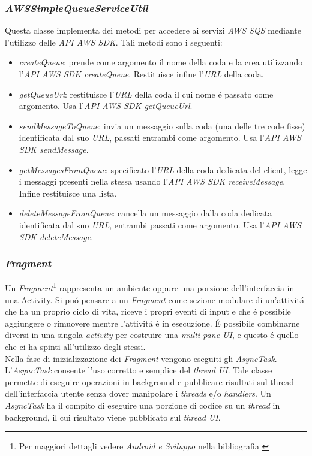 \documentclass{article}
\begin{document}
\subsubsection{\textit{AWSSimpleQueueServiceUtil}}
Questa classe implementa dei metodi per accedere ai servizi \textit{AWS SQS} mediante l'utilizzo delle \textit{API AWS SDK}. Tali metodi sono i seguenti:
\begin{itemize}
\item	{\textit{createQueue}: prende come argomento il nome della coda e la crea utilizzando l'\textit{API AWS SDK createQueue}. Restituisce infine l'\textit{URL} della coda.}
\item	{\textit{getQueueUrl}: restituisce l'\textit{URL} della coda il cui nome \'e passato come argomento. Usa l'\textit{API AWS SDK getQueueUrl}.}
\item	{\textit{sendMessageToQueue}: invia un messaggio sulla coda (una delle tre code fisse) identificata dal suo \textit{URL}, passati entrambi come argomento.  Usa l'\textit{API AWS SDK sendMessage}. }
\item	{\textit{getMessagesFromQueue}: specificato l'\textit{URL} della coda dedicata del client, legge i messaggi presenti nella stessa usando l'\textit{API AWS SDK receiveMessage}. Infine restituisce una lista.}
\item 	{\textit{deleteMessageFromQueue}: cancella un messaggio dalla coda dedicata identificata dal suo \textit{URL}, entrambi passati come argomento. Usa l'\textit{API AWS SDK deleteMessage}.}
\end{itemize}
\subsubsection{\textit{Fragment}}
Un \textit{Fragment}\footnote{Per maggiori dettagli vedere \textit{Android e Sviluppo} nella bibliografia \label{fn:Sviluppo}} rappresenta un ambiente oppure una porzione dell'interfaccia in una Activity. Si pu\'o pensare a un \textit{Fragment} come sezione modulare di un'attivit\'a che ha un proprio ciclo di vita, riceve i propri eventi di input e che \'e possibile aggiungere o rimuovere mentre l'attivit\'a \'e in esecuzione. 
\'E possibile combinarne diversi in una singola \textit{activity} per costruire una \textit{multi-pane UI}, e questo \'e quello che ci ha spinti all'utilizzo degli stessi.
\\Nella fase di inizializzazione dei \textit{Fragment} vengono eseguiti gli \textit{AsyncTask}. \\L'\textit{AsyncTask} consente l'uso corretto e semplice del \textit{thread UI}. Tale classe permette di eseguire operazioni in background e pubblicare risultati sul thread dell'interfaccia utente senza dover manipolare i \textit{threads} e/o \textit{handlers}. Un \textit{AsyncTask} ha il compito di eseguire una porzione di codice su un \textit{thread} in background, il cui risultato viene pubblicato sul \textit{thread UI}.
\end{document}
